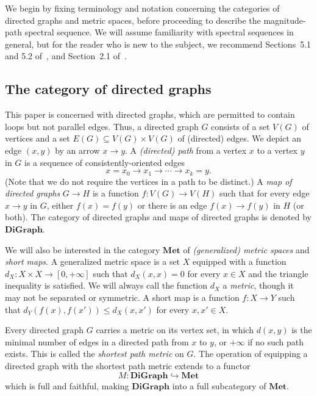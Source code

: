 \documentclass[a4paper, 11 pt, oneside, reqno]{amsart}
\numberwithin{lemma}{section}
\theoremstyle{definition}
\newcommand{\demph}[1]{\emph{#1}}
\newcommand{\cn}[1]{\mathbf{#1}}
\begin{document}
We begin by fixing terminology and notation concerning the categories of directed graphs and metric spaces, before proceeding to describe the magnitude-path spectral sequence. We will assume familiarity with spectral sequences in 
general, but for the reader who is new to the subject, 
we recommend Sections~5.1 and 5.2 of~\cite{Weibel},
and Section~2.1 of~\cite{McCleary}.

\subsection{The category of directed graphs}
\label{sec:digraph_met}

This paper is concerned with directed graphs, which are permitted to contain loops but not parallel edges. Thus, a directed graph \(G\) consists of a set \(V(G)\) of vertices and a set \(E(G) \subseteq V(G) \times V(G)\) of (directed) edges. We depict an edge \((x,y)\) by an arrow \(x \to y\). A \demph{(directed) path} from a vertex \(x\) to a vertex \(y\) in \(G\) is a sequence of consistently-oriented edges
\[x = x_0 \to x_1 \to \cdots \to x_k = y.\]
(Note that we do not require the vertices in a path to be distinct.) A \demph{map of directed graphs} \(G \to H\) is a function \(f\colon V(G) \to V(H)\) such that for every edge \(x \to y\) in \(G\), either \(f(x) = f(y)\) or there is an edge \(f(x) \to f(y)\) in \(H\) (or both). The category of directed graphs and maps of directed graphs is denoted by \(\cn{DiGraph}\).

We will also be interested in the category \(\cn{Met}\) of \demph{(generalized) metric spaces} and \demph{short maps}. A generalized metric space is a set \(X\) equipped with a function \(d_X\colon X \times X \to [0, +\infty]\) such that \(d_X(x,x)=0\) for every \(x \in X\) and the triangle inequality is satisfied. We will always call the function \(d_X\) a \demph{metric}, though it may not be separated or symmetric. A short map is a function \(f\colon X \to Y\) such that \(d_Y(f(x),f(x')) \leq d_X(x,x')\) for every \(x,x' \in X\).

Every directed graph \(G\) carries a metric on its vertex set, in which \(d(x,y)\) is the minimal number of edges in a directed path from \(x\) to \(y\), or \(+\infty\) if no such path exists. This is called the \demph{shortest path metric} on \(G\). The operation of equipping a directed graph with the shortest path metric extends to a functor
\[M\colon \cn{DiGraph} \hookrightarrow \cn{Met}\]
which is full and faithful, making \(\cn{DiGraph}\) into a full subcategory of \(\cn{Met}\).
\end{document}
